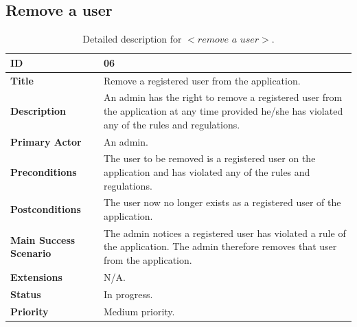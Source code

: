 \documentclass[11pt]{extarticle}
\begin{document}
\newpage
\subsection{Remove a user}
\begin{table}[H]
    \begin{center}
        \begin{tabular}{ |m{6cm}|p{6cm}| } 
           \hline
           \textbf{ID} & 06\\
           \hline
           \textbf{Title} & Remove a registered user from the application.\\
           \hline
           \textbf{Description} & An admin has the right to remove a registered user from the application at any time provided he/she has violated any of the rules and regulations.\\
           \hline
           \textbf{Primary Actor} & An admin.\\
           \hline
           \textbf{Preconditions} & The user to be removed is a registered user on the application and has violated any of the rules and regulations.\\
           \hline
           \textbf{Postconditions} & The user now no longer exists as a registered user of the application.\\
           \hline
           \textbf{Main Success Scenario} & The admin notices a registered user has violated a rule of the application. The admin therefore removes that user from the application.\\
           \hline
           \textbf{Extensions} & N/A.\\
           \hline
           \textbf{Status} & In progress.\\
           \hline
           \textbf{Priority} & Medium priority.\\
           \hline
        \end{tabular}
    \end{center}
    \caption{\label{tab:Table 6} Detailed description for $<\textit{remove a user}>$.}
\end{table}

\newpage
\end{document}
